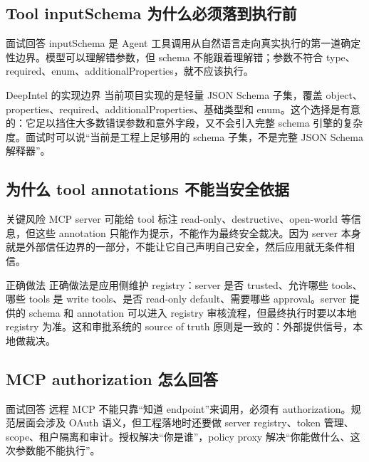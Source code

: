 \subsection{Tool inputSchema 为什么必须落到执行前}
\begin{qaBox}{面试回答}
inputSchema 是 Agent 工具调用从自然语言走向真实执行的第一道确定性边界。模型可以理解错参数，但 schema 不能跟着理解错；参数不符合 type、required、enum、additionalProperties，就不应该执行。
\end{qaBox}

\begin{analysisBox}{DeepIntel 的实现边界}
当前项目实现的是轻量 JSON Schema 子集，覆盖 object、properties、required、additionalProperties、基础类型和 enum。这个选择是有意的：它足以挡住大多数错误参数和意外字段，又不会引入完整 schema 引擎的复杂度。面试时可以说“当前是工程上足够用的 schema 子集，不是完整 JSON Schema 解释器”。
\end{analysisBox}

\subsection{为什么 tool annotations 不能当安全依据}
\begin{riskBox}{关键风险}
MCP server 可能给 tool 标注 read-only、destructive、open-world 等信息，但这些 annotation 只能作为提示，不能作为最终安全裁决。因为 server 本身就是外部信任边界的一部分，不能让它自己声明自己安全，然后应用就无条件相信。
\end{riskBox}

\begin{analysisBox}{正确做法}
正确做法是应用侧维护 registry：server 是否 trusted、允许哪些 tools、哪些 tools 是 write tools、是否 read-only default、需要哪些 approval。server 提供的 schema 和 annotation 可以进入 registry 审核流程，但最终执行时要以本地 registry 为准。这和审批系统的 source of truth 原则是一致的：外部提供信号，本地做裁决。
\end{analysisBox}

\subsection{MCP authorization 怎么回答}
\begin{qaBox}{面试回答}
远程 MCP 不能只靠“知道 endpoint”来调用，必须有 authorization。规范层面会涉及 OAuth 语义，但工程落地时还要做 server registry、token 管理、scope、租户隔离和审计。授权解决“你是谁”，policy proxy 解决“你能做什么、这次参数能不能执行”。
\end{qaBox}

